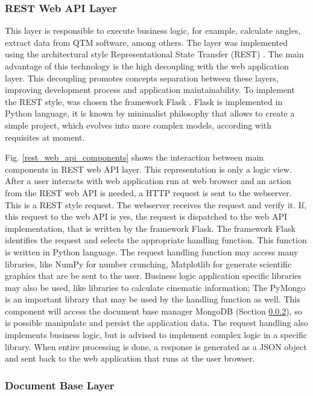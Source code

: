 \documentclass[journal]{IEEEtran}
\begin{document}
\subsubsection{REST Web API Layer}
\label{rest_web_api_layer}

This layer is responsible to execute business logic, for example,
calculate angles, extract data   from QTM software, among others.
The layer was implemented using the architectural style Representational State Transfer (REST) 
\cite{Grinberg2014}.
The main advantage of this technology is the high decoupling with the web application layer.
This decoupling promotes concepts separation between these layers, improving development process
and application maintainability.
To implement the REST style, was chosen the framework Flask \cite{Maia2015}.
Flask is implemented in Python language, it is known by minimalist philosophy 
that allows to create a simple project, which evolves into more complex models, according with
requisites at moment.

Fig. \ref{rest_web_api_components} shows the interaction between  main components in REST web API layer.
This representation is only a logic view.
After a user interacts with web application run at web browser and an action from the REST web API is
needed, a HTTP request is sent to the webserver. This is a REST style request.
The webserver receives the request and verify it. If, this request to the web API is  yes, the
request is dispatched to the web API implementation, that is written by the framework Flask.
The framework Flask identifies the request and selects the appropriate handling function. 
This function is written in Python language. 
The request handling function may access many libraries, like NumPy for number crunching,
Matplotlib for generate scientific graphics that are be sent to the user. 
Business logic application specific libraries may also be used, like libraries to calculate
cinematic information;
The PyMongo is an important library that may be used by the handling function as well.
This component will access the document base manager MongoDB (Section \ref{document_base_layer}),
so is possible manipulate and persist the application data.
The request handling also implements business logic, but is advised to implement complex logic in a specific
library.
When entire processing is done, a response is generated as a JSON object and sent back to 
the web application that runs at the user browser.
\subsubsection{Document Base Layer}
\label{document_base_layer}
\end{document}
